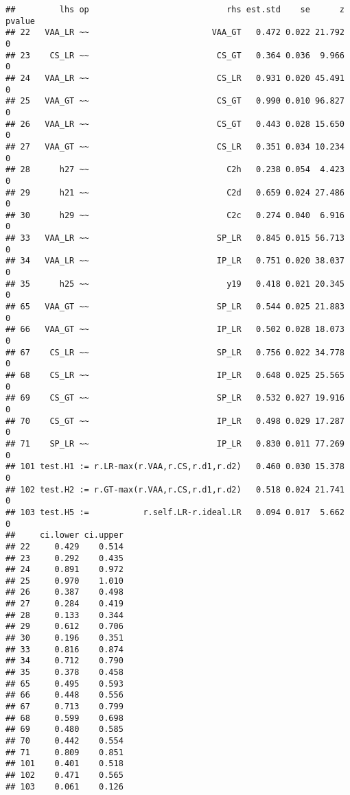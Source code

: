 \documentclass[
]{article}
\newenvironment{Shaded}{\begin{snugshade}}{\end{snugshade}}
\newcommand{\CommentTok}[1]{\textcolor[rgb]{0.56,0.35,0.01}{\textit{#1}}}
\newcommand{\DecValTok}[1]{\textcolor[rgb]{0.00,0.00,0.81}{#1}}
\newcommand{\KeywordTok}[1]{\textcolor[rgb]{0.13,0.29,0.53}{\textbf{#1}}}
\newcommand{\NormalTok}[1]{#1}
\newcommand{\OperatorTok}[1]{\textcolor[rgb]{0.81,0.36,0.00}{\textbf{#1}}}
\newcommand{\StringTok}[1]{\textcolor[rgb]{0.31,0.60,0.02}{#1}}
\begin{document}
\begin{verbatim}
##         lhs op                            rhs est.std    se      z pvalue
## 22   VAA_LR ~~                         VAA_GT   0.472 0.022 21.792      0
## 23    CS_LR ~~                          CS_GT   0.364 0.036  9.966      0
## 24   VAA_LR ~~                          CS_LR   0.931 0.020 45.491      0
## 25   VAA_GT ~~                          CS_GT   0.990 0.010 96.827      0
## 26   VAA_LR ~~                          CS_GT   0.443 0.028 15.650      0
## 27   VAA_GT ~~                          CS_LR   0.351 0.034 10.234      0
## 28      h27 ~~                            C2h   0.238 0.054  4.423      0
## 29      h21 ~~                            C2d   0.659 0.024 27.486      0
## 30      h29 ~~                            C2c   0.274 0.040  6.916      0
## 33   VAA_LR ~~                          SP_LR   0.845 0.015 56.713      0
## 34   VAA_LR ~~                          IP_LR   0.751 0.020 38.037      0
## 35      h25 ~~                            y19   0.418 0.021 20.345      0
## 65   VAA_GT ~~                          SP_LR   0.544 0.025 21.883      0
## 66   VAA_GT ~~                          IP_LR   0.502 0.028 18.073      0
## 67    CS_LR ~~                          SP_LR   0.756 0.022 34.778      0
## 68    CS_LR ~~                          IP_LR   0.648 0.025 25.565      0
## 69    CS_GT ~~                          SP_LR   0.532 0.027 19.916      0
## 70    CS_GT ~~                          IP_LR   0.498 0.029 17.287      0
## 71    SP_LR ~~                          IP_LR   0.830 0.011 77.269      0
## 101 test.H1 := r.LR-max(r.VAA,r.CS,r.d1,r.d2)   0.460 0.030 15.378      0
## 102 test.H2 := r.GT-max(r.VAA,r.CS,r.d1,r.d2)   0.518 0.024 21.741      0
## 103 test.H5 :=           r.self.LR-r.ideal.LR   0.094 0.017  5.662      0
##     ci.lower ci.upper
## 22     0.429    0.514
## 23     0.292    0.435
## 24     0.891    0.972
## 25     0.970    1.010
## 26     0.387    0.498
## 27     0.284    0.419
## 28     0.133    0.344
## 29     0.612    0.706
## 30     0.196    0.351
## 33     0.816    0.874
## 34     0.712    0.790
## 35     0.378    0.458
## 65     0.495    0.593
## 66     0.448    0.556
## 67     0.713    0.799
## 68     0.599    0.698
## 69     0.480    0.585
## 70     0.442    0.554
## 71     0.809    0.851
## 101    0.401    0.518
## 102    0.471    0.565
## 103    0.061    0.126
\end{verbatim}

\begin{Shaded}
\end{Shaded}
\end{document}
